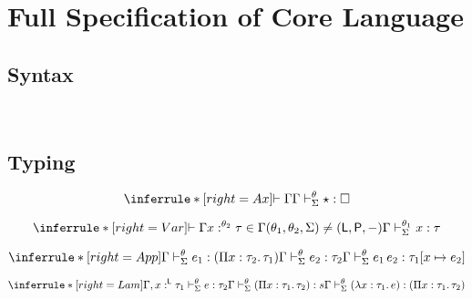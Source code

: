 \section{Full Specification of Core Language}

\subsection{Syntax}
\gram{\ottth\ottinterrule
      \ottsig\ottinterrule
      \otte\ottinterrule
      \ottG\ottinterrule
      \ottv}
\\[2.0mm]


\subsection{Typing}

\newcommand{\pgm}{\mathsf{P}}
\newcommand{\nat}{\mathsf{nat}}
\newcommand{\logic}{\mathsf{L}}
\newcommand{\judge}{\Gamma \vdash^\theta_\Sigma}


\framebox{$ \judge e : \tau$ }


\[
\inferrule*[right=Ax]
{\vdash \Gamma} {\judge \star : \square}
\]

\[
\inferrule*[right=Var]
{\vdash \Gamma \\ x :^{\theta_2} \tau \in \Gamma \\ (\theta_1, \theta_2, \Sigma) \neq (\logic, \pgm, -)} {\Gamma \vdash^{\theta_1}_\Sigma x : \tau}
\]



\[
\inferrule*[right=App]
{\judge e_1 : (\Pi x : \tau_2 .\, \tau_1) \\ \judge e_2 : \tau_2} {\judge e_1\,e_2 : \tau_1[x \mapsto e_2]}
\]

\[
\inferrule*[right=Lam]
{\Gamma,x:^\logic \tau_1 \vdash^\theta_\Sigma e : \tau_2 \\ \judge (\Pi x : \tau_1 .\, \tau_2) : s} {\judge (\lambda x : \tau_1 .\, e) : (\Pi x : \tau_1 .\, \tau_2)}
\]


